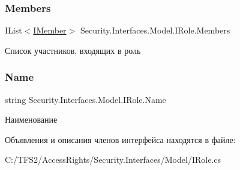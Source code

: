 \subsubsection{\texorpdfstring{Members}{Members}}
{\footnotesize\ttfamily I\+List$<$\hyperlink{interface_security_1_1_interfaces_1_1_model_1_1_i_member}{I\+Member}$>$ Security.\+Interfaces.\+Model.\+I\+Role.\+Members\hspace{0.3cm}{\ttfamily [get]}}



Список участников, входящих в роль 

\mbox{\label{interface_security_1_1_interfaces_1_1_model_1_1_i_role_a30342eb8535f6c5f9a268581029ea756}} 
\subsubsection{\texorpdfstring{Name}{Name}}
{\footnotesize\ttfamily string Security.\+Interfaces.\+Model.\+I\+Role.\+Name\hspace{0.3cm}{\ttfamily [get]}}



Наименование 



Объявления и описания членов интерфейса находятся в файле\+:\begin{DoxyCompactItemize}
\item 
C\+:/\+T\+F\+S2/\+Access\+Rights/\+Security.\+Interfaces/\+Model/I\+Role.\+cs\end{DoxyCompactItemize}
